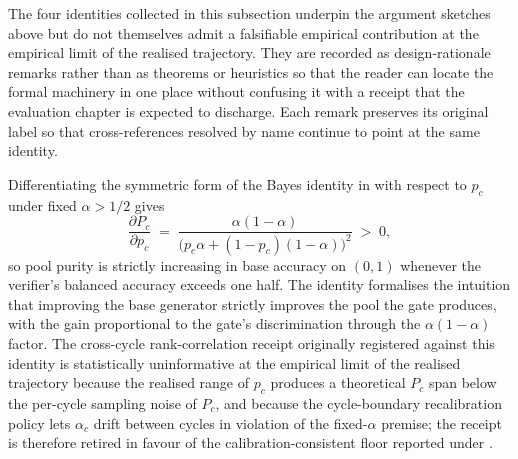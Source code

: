 The four identities collected in this subsection underpin the argument sketches above but do not themselves admit a falsifiable empirical contribution at the empirical limit of the realised trajectory. They are recorded as design-rationale remarks rather than as theorems or heuristics so that the reader can locate the formal machinery in one place without confusing it with a receipt that the evaluation chapter is expected to discharge. Each remark preserves its original label so that cross-references resolved by name continue to point at the same identity.

\begin{remark}
\label{thm:monotone-purification}
Differentiating the symmetric form of the Bayes identity in  with respect to $p_c$ under fixed $\alpha > 1/2$ gives
\begin{equation}
\frac{\partial P_c}{\partial p_c} \;=\; \frac{\alpha(1-\alpha)}{\big(p_c \alpha + (1-p_c)(1-\alpha)\big)^{2}} \;>\; 0,
\label{eq:monotone-purification}
\end{equation}
so pool purity is strictly increasing in base accuracy on $(0,1)$ whenever the verifier's balanced accuracy exceeds one half. The identity formalises the intuition that improving the base generator strictly improves the pool the gate produces, with the gain proportional to the gate's discrimination through the $\alpha(1-\alpha)$ factor. The cross-cycle rank-correlation receipt originally registered against this identity is statistically uninformative at the empirical limit of the realised trajectory because the realised range of $p_c$ produces a theoretical $P_c$ span below the per-cycle sampling noise of $P_c$, and because the cycle-boundary recalibration policy lets $\alpha_c$ drift between cycles in violation of the fixed-$\alpha$ premise; the receipt is therefore retired in favour of the calibration-consistent floor reported under .
\end{remark}

